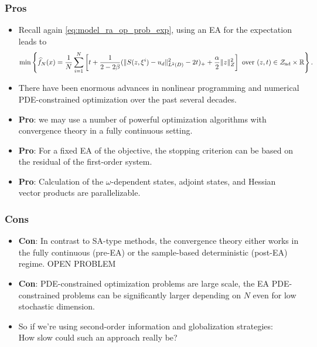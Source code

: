 \documentclass[aspectratio=169,xcolor=dvipsnames,10pt]{beamer}
\newcommand{\Zad}{\mathcal{Z}_{\text{\textup{ad}}}}
\begin{document}
\begin{frame}\frametitle{Pros}
\begin{block}{}
\begin{itemize}
\item Recall again \eqref{eq:model_ra_op_prob_exp}, using an EA for the expectation leads to
\begin{equation*}%
\aligned
\mathrm{min}
\left\{ 
\widehat{f}_{N}(x) =
\frac{1}{N} \sum_{i=1}^{N}
\left[
t + \frac{1}{2-2\beta}( \| S(z,\xi^i) - u_d \|^2_{L^2(D)} - 2t)_+ 
  + \frac{\alpha}{2} \| z \|^2_{Z}
\right] \text{ over } (z,t) \in \Zad \times \mathbb R 
\right\}.
\endaligned
\end{equation*}
\item There have been enormous advances in nonlinear programming and numerical PDE-constrained optimization over the past several decades.
\item \textbf{Pro}: we may use a number of powerful optimization algorithms with convergence theory in a fully continuous setting.
\item \textbf{Pro}: For a fixed EA of the objective, the stopping criterion can be based on the residual of the first-order system.
\item \textbf{Pro}: Calculation of the $\omega$-dependent states, adjoint states, and Hessian vector products are parallelizable.
\end{itemize}
\end{block}
\end{frame}
\begin{frame}\frametitle{Cons}
\begin{block}{}
\begin{itemize}
\item \textbf{Con}: In contrast to SA-type methods, the convergence theory either works in the fully continuous (pre-EA) or the sample-based deterministic (post-EA) regime. \alert{OPEN PROBLEM}
\item \textbf{Con}: PDE-constrained optimization problems are large scale, the EA PDE-constrained problems can be significantly larger depending on $N$ even for low stochastic dimension. 
\item So if we're using second-order information and globalization strategies:\\  \centering How \alert{slow} could such an approach really be?
\end{itemize}
\end{block}
\end{frame}
\end{document}
